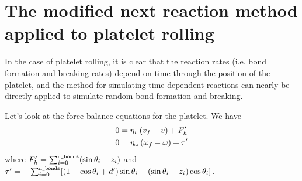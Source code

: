 \documentclass{article}
\begin{document}
\section{The modified next reaction method applied to platelet
  rolling}
\label{sec:plt-rolling}

In the case of platelet rolling, it is clear that the reaction rates
(i.e. bond formation and breaking rates) depend on time through the
position of the platelet, and the method for simulating time-dependent
reactions can nearly be directly applied to simulate random bond
formation and breaking.

Let's look at the force-balance equations for the platelet. We have
\begin{align}
  0 &= \eta_v \left(v_f - v \right) +
  F_h' \\
  0 &= \eta_\omega \left(\omega_f - \omega \right) + \tau'
\end{align}
where $F_h' = \sum_{i=0}^\texttt{n\_bonds}
(\sin\theta_i - z_i )$ and $\tau' =
-\sum_{i=0}^\texttt{n\_bonds} [(1 - \cos\theta_i +
d')\sin\theta_i + (\sin\theta_i - z_i)\cos\theta_i]$.


\end{document}
